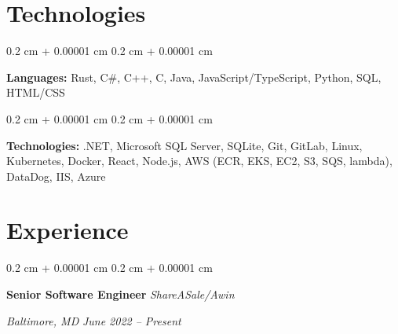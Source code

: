 \documentclass[10pt, letterpaper]{article}
\newenvironment{onecolentry}{
    \begin{adjustwidth}{
            0.2 cm + 0.00001 cm
        }{
            0.2 cm + 0.00001 cm
        }
    }{
    \end{adjustwidth}
} %
\newenvironment{twocolentry}[2][]{
    \onecolentry
    \def\secondColumn{#2}
    \setcolumnwidth{\fill, 10.5 cm}
    \begin{paracol}{2}
    }{
        \switchcolumn \raggedleft \secondColumn
    \end{paracol}
    \endonecolentry
} %
\begin{document}
\section{Technologies}
\begin{onecolentry}
    \textbf{Languages:} Rust, C\#, C++, C, Java, JavaScript/TypeScript, Python, SQL, HTML/CSS
\end{onecolentry}
\vspace{0.2 cm}
\begin{onecolentry}
    \textbf{Technologies:} .NET, Microsoft SQL Server, SQLite, Git, GitLab, Linux, Kubernetes, Docker, React, Node.js, AWS (ECR, EKS, EC2, S3, SQS, lambda), DataDog, IIS, Azure
\end{onecolentry}
\section{Experience}
\begin{twocolentry}{
    \textit{Baltimore, MD}
    \textit{June 2022 – Present}}
    \textbf{Senior Software Engineer}
    \newline
    \textit{ShareASale/Awin}
\end{twocolentry}
\end{document}
